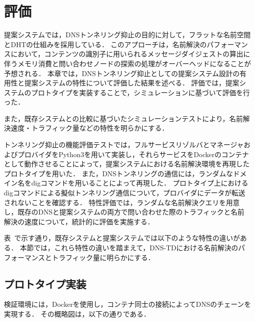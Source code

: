 \section{評価}
\label{sec:evaluation}
提案システムでは，DNSトンネリング抑止の目的に対して，フラットな名前空間とDHTの仕組みを採用している．
このアプローチは，名前解決のパフォーマンスにおいて，コンテンツの識別子に用いられるメッセージダイジェストの算出に伴うメモリ消費と問い合わせノードの探索の処理がオーバーヘッドになることが予想される．
本章では，DNSトンネリング抑止としての提案システム設計の有用性と提案システムの特性について評価した結果を述べる．
評価では，提案システムのプロトタイプを実装することで，シミュレーションに基づいて評価を行った．

また，既存システムとの比較に基づいたシミュレーションテストにより，名前解決速度・トラフィック量などの特性を明らかにする．

トンネリング抑止の機能評価テストでは，フルサービスリゾルバとマネージャおよびプロバイダをPython3を用いて実装し，それらサービスをDockerのコンテナとして動作させることによって，提案システムにおける名前解決環境を再現したプロトタイプを用いた．
また，DNSトンネリングの通信には，ランダムなドメイン名をdigコマンドを用いることによって再現した．
プロトタイプ上におけるdigコマンドによる擬似トンネリング通信について，プロバイダにデータが転送されないことを確認する．
特性評価では，ランダムな名前解決クエリを用意し，既存のDNSと提案システムの両方で問い合わせた際のトラフィックと名前解決の速度について，統計的に評価を実施する．

表~\cite{tab:diff_feature}で示す通り，既存システムと提案システムでは以下のような特性の違いがある．
本節では，これら特性の違いを踏まえて，DNS-TDにおける名前解決のパフォーマンスとトラフィック量に明らかにする．


\subsection{プロトタイプ実装}
検証環境には，Dockerを使用し，コンテナ同士の接続によってDNSのチェーンを実現する．
その概略図は，以下の通りである．

